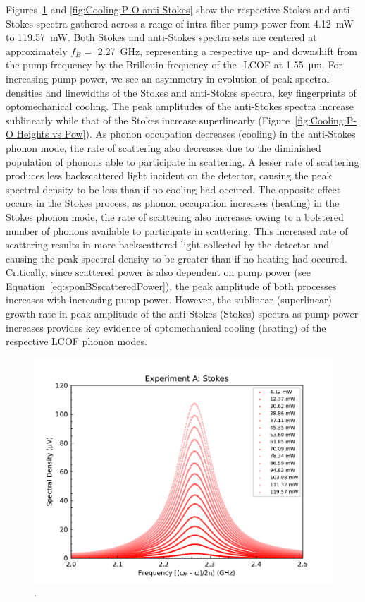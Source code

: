 Figures~\ref{fig:Cooling:P-O Stokes} and \ref{fig:Cooling:P-O anti-Stokes} show the respective Stokes and anti-Stokes spectra gathered across a range of intra-fiber pump power from \SI{4.12}{\milli\watt} to \SI{119.57}{\milli\watt}. Both Stokes and anti-Stokes spectra sets are centered at approximately \(f_{B} = \) \SI{2.27}{\giga\hertz}, representing a respective up- and downshift from the pump frequency by the Brillouin frequency of the -\ac{LCOF} at \SI{1.55}{\micro\meter}. For increasing pump power, we see an asymmetry in evolution of peak spectral densities and linewidths of the Stokes and anti-Stokes spectra, key fingerprints of optomechanical cooling. The peak amplitudes of the anti-Stokes spectra increase sublinearly while that of the Stokes increase superlinearly (Figure~\ref{fig:Cooling:P-O Heights vs Pow}). As phonon occupation decreases (cooling) in the anti-Stokes phonon mode, the rate of scattering also decreases due to the diminished population of phonons able to participate in scattering. A lesser rate of scattering produces less backscattered light incident on the detector, causing the peak spectral density to be less than if no cooling had occured. The opposite effect occurs in the Stokes process; as phonon occupation increases (heating) in the Stokes phonon mode, the rate of scattering also increases owing to a bolstered number of phonons available to participate in scattering. This increased rate of scattering results in more backscattered light collected by the detector and causing the peak spectral density to be greater than if no heating had occured. Critically, since scattered power is also dependent on pump power (see Equation~\ref{eq:sponBSscatteredPower}), the peak amplitude of both processes increases with increasing pump power. However, the sublinear (superlinear) growth rate in peak amplitude of the anti-Stokes (Stokes) spectra as pump power increases provides key evidence of optomechanical cooling (heating) of the respective \ac{LCOF} phonon modes.

\begin{figure}[t]
  \centering
  \includegraphics[width=\textwidth]{figs/3-Cooling/P-O Stokes.pdf}
  \caption{.}
  \label{fig:Cooling:P-O Stokes}
\end{figure}

